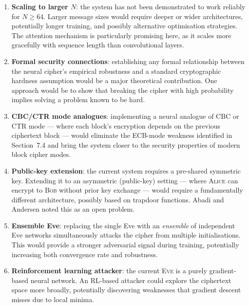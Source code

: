 \documentclass[12pt, a4paper]{article}
\newcommand{\alice}{\textsc{Alice}}
\newcommand{\bob}{\textsc{Bob}}
\newcommand{\eve}{\textsc{Eve}}
\begin{document}
\begin{enumerate}[leftmargin=2em, itemsep=6pt]

  \item \textbf{Scaling to larger $N$}: the system has not been
        demonstrated to work reliably for $N \geq 64$. Larger message
        sizes would require deeper or wider architectures, potentially
        longer training, and possibly alternative optimisation strategies.
        The attention mechanism is particularly promising here, as it
        scales more gracefully with sequence length than convolutional
        layers.

  \item \textbf{Formal security connections}: establishing any formal
        relationship between the neural cipher's empirical robustness
        and a standard cryptographic hardness assumption would be a
        major theoretical contribution. One approach would be to show
        that breaking the cipher with high probability implies solving
        a problem known to be hard.

  \item \textbf{CBC/CTR mode analogues}: implementing a neural analogue
        of CBC or CTR mode --- where each block's encryption depends on
        the previous ciphertext block --- would eliminate the ECB-mode
        weakness identified in Section~7.4 and bring the system closer
        to the security properties of modern block cipher modes.

  \item \textbf{Public-key extension}: the current system requires a
        pre-shared symmetric key. Extending it to an asymmetric
        (public-key) setting --- where \alice{} can encrypt to \bob{}
        without prior key exchange --- would require a fundamentally
        different architecture, possibly based on trapdoor functions.
        Abadi and Andersen noted this as an open problem.

  \item \textbf{Ensemble Eve}: replacing the single Eve with an
        \emph{ensemble} of independent Eve networks simultaneously
        attacks the cipher from multiple initialisations. This would
        provide a stronger adversarial signal during training, potentially
        increasing both convergence rate and robustness.

  \item \textbf{Reinforcement learning attacker}: the current \eve{} is
        a purely gradient-based neural network. An RL-based attacker
        could explore the ciphertext space more broadly, potentially
        discovering weaknesses that gradient descent misses due to
        local minima.

\end{enumerate}
\end{document}
